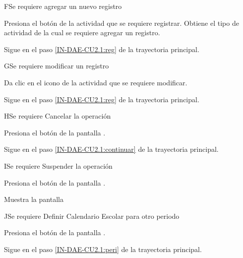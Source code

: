 
\begin{UCtrayectoriaA}{F}{Se requiere agregar un nuevo registro }
	
	\UCpaso [\UCactor] Presiona el botón  de la actividad que se requiere registrar.
	\UCpaso Obtiene el tipo de actividad de la cual se requiere agregar un registro.
	
	\UCpaso Sigue en el paso \ref{IN-DAE-CU2.1:reg}  de la trayectoria principal. 
	
\end{UCtrayectoriaA}
%	
	\begin{UCtrayectoriaA}{G}{Se requiere modificar un registro }
		
		\UCpaso [\UCactor] Da clic en el icono \IURegistrar de la actividad que se requiere modificar.
		
		\UCpaso Sigue en el paso \ref{IN-DAE-CU2.1:reg}  de la trayectoria principal. 
		
\end{UCtrayectoriaA}

\begin{UCtrayectoriaA}{H}{Se requiere Cancelar la operación}
	
	\UCpaso [\UCactor] 	Presiona el botón  de la pantalla .
	
	\UCpaso Sigue en el paso \ref{IN-DAE-CU2.1:continuar}  de la trayectoria principal.
\end{UCtrayectoriaA}


\begin{UCtrayectoriaA}{I}{Se requiere Suspender la operación}
	
	\UCpaso [\UCactor] 	Presiona el botón  de la pantalla .
	
	\UCpaso Muestra la pantalla  
\end{UCtrayectoriaA}


\begin{UCtrayectoriaA}{J}{Se requiere Definir Calendario Escolar para otro periodo}
	
	\UCpaso [\UCactor] 	Presiona el botón   de la pantalla .
	
	\UCpaso Sigue en el paso \ref{IN-DAE-CU2.1:peri}  de la trayectoria principal.
\end{UCtrayectoriaA}

